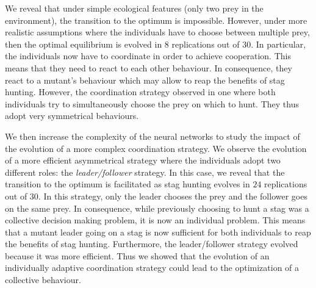 We reveal that under simple ecological features (only two prey in the environment), the transition to the optimum is impossible. However, under more realistic assumptions where the individuals have to choose between multiple prey, then the optimal equilibrium is evolved in $8$ replications out of $30$. In particular, the individuals now have to coordinate in order to achieve cooperation. This means that they need to react to each other behaviour. In consequence, they react to a mutant's behaviour which may allow to reap the benefits of stag hunting. However, the coordination strategy observed in one where both individuals try to simultaneously choose the prey on which to hunt. They thus adopt very symmetrical behaviours.

We then increase the complexity of the neural networks to study the impact of the evolution of a more complex coordination strategy. We observe the evolution of a more efficient asymmetrical strategy where the individuals adopt two different roles: the \emph{leader/follower} strategy. In this case, we reveal that the transition to the optimum is facilitated as stag hunting evolves in $24$ replications out of $30$. In this strategy, only the leader chooses the prey and the follower goes on the same prey. In consequence, while previously choosing to hunt a stag was a collective decision making problem, it is now an individual problem. This means that a mutant leader going on a stag is now sufficient for both individuals to reap the benefits of stag hunting. Furthermore, the leader/follower strategy evolved because it was more efficient. Thus we showed that the evolution of an individually adaptive coordination strategy could lead to the optimization of a collective behaviour.